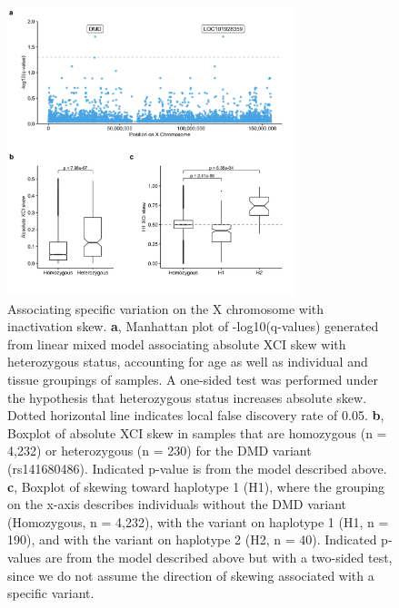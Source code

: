 \begin{figure}[ht!]
    \centering
    \includegraphics[width=0.75\textwidth]{chapter4/Figures/Figure_3.png}
    \caption{
        Associating specific variation on the X chromosome with inactivation skew. 
        \textbf{a}, Manhattan plot of -log10(q-values) generated from linear mixed model associating absolute XCI skew with heterozygous status, accounting for age as well as individual and tissue groupings of samples. A one-sided test was performed under the hypothesis that heterozygous status increases absolute skew. Dotted horizontal line indicates local false discovery rate of 0.05. 
        \textbf{b}, Boxplot of absolute XCI skew in samples that are homozygous  (n = 4,232) or heterozygous (n = 230) for the DMD variant (rs141680486). Indicated p-value is from the model described above.
        \textbf{c}, Boxplot of skewing toward haplotype 1 (H1), where the grouping on the x-axis describes individuals without the DMD variant (Homozygous, n = 4,232), with the variant on haplotype 1 (H1, n = 190), and with the variant on haplotype 2 (H2, n = 40). Indicated p-values are from the model described above but with a two-sided test, since we do not assume the direction of skewing associated with a specific variant.}
    \label{fig:fig4.3}
\end{figure}